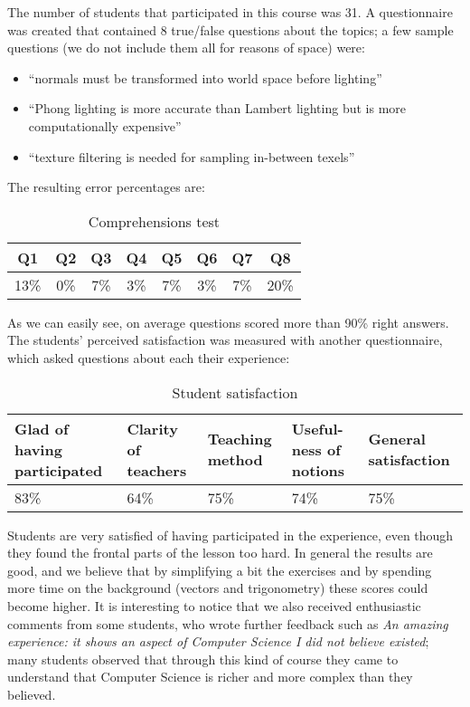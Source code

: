 The number of students that participated in this course was 31. A questionnaire was created that contained 8 true/false questions about the topics; a few sample questions (we do not include them all for reasons of space) were:

\begin{itemize}
\item ``normals must be transformed into world space before lighting''
\item ``Phong lighting is more accurate than Lambert lighting but is more computationally expensive''
\item ``texture filtering is needed for sampling in-between texels''
\end{itemize}

The resulting error percentages are:

\begin{table}[htb]
\centering
\begin{tabular}{|c|c|c|c|c|c|c|c|}
\hline
Q1 & Q2 & Q3 & Q4 & Q5 & Q6 & Q7 & Q8 \\
\hline
13\% &	0\%	& 7\%	& 3\%	& 7\%	& 3\%	& 7\%	& 20\% \\
\hline
\end{tabular}
\caption{Comprehensions test}
\end{table}

As we can easily see, on average questions scored more than 90\% right answers. The students' perceived satisfaction was measured with another questionnaire, which asked questions about each their experience:

\begin{table}[htb]
\centering
\begin{tabular}{|p{1.2cm}|p{1.2cm}|p{1.2cm}|p{1.2cm}|p{1.2cm}|}
\hline
Glad of having participated & Clarity of teachers & Teaching method & Useful-ness of notions & General satisfaction 		\\
\hline
83\%	& 64\%	& 75\%	& 74\%	& 75\% \\
\hline
\end{tabular}
\caption{Student satisfaction}
\end{table}


Students are very satisfied of having participated in the experience, even though they found the frontal parts of the lesson too hard. In general the results are good, and we believe that by simplifying a bit the exercises and by spending more time on the background (vectors and trigonometry) these scores could become higher. It is interesting to notice that we also received enthusiastic comments from some students, who wrote further feedback such as \textit{An amazing experience: it shows an aspect of Computer Science I did not believe existed}; many students observed that through this kind of course they came to understand that Computer Science is richer and more complex than they believed.


